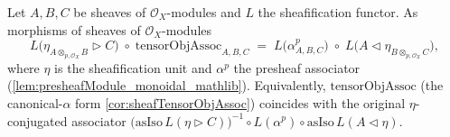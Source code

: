 \begin{lemma}\leanok
  \label{lem:tensorObjAssoc_eta_factor_sheaf}
  Let \(A, B, C\) be sheaves of \(\mathcal{O}_X\)-modules and \(L\) the sheafification
  functor. As morphisms of sheaves of \(\mathcal{O}_X\)-modules
  \[
    L\bigl(\eta_{A \otimes_{p,\mathcal{O}_X} B} \rhd C\bigr)
      \;\circ\; \mathrm{tensorObjAssoc}_{A,B,C}
    \;=\;
    L\bigl(\alpha^{p}_{A,B,C}\bigr)
      \;\circ\; L\bigl(A \lhd \eta_{B \otimes_{p,\mathcal{O}_X} C}\bigr),
  \]
  where \(\eta\) is the sheafification unit and \(\alpha^{p}\) the presheaf
  associator (\cref{lem:presheafModule_monoidal_mathlib}). Equivalently,
  \(\mathrm{tensorObjAssoc}\) (the canonical-\(\alpha\) form
  \cref{cor:sheafTensorObjAssoc}) coincides with the original \(\eta\)-conjugated
  associator \(\bigl(\mathrm{asIso}\,L(\eta \rhd C)\bigr)^{-1}
  \circ L(\alpha^{p}) \circ \mathrm{asIso}\,L(A \lhd \eta)\).
\end{lemma}

